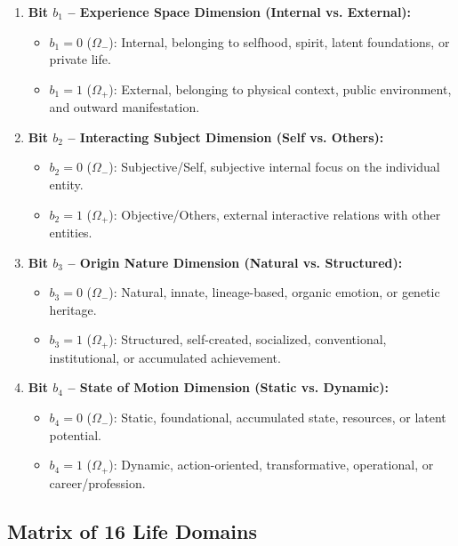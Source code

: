 \documentclass[a4paper,14pt, twoside]{memoir}
\begin{document}
\begin{enumerate}[label=\arabic*.]
	\item \textbf{Bit $b_1$ -- Experience Space Dimension (Internal vs. External):}
	      \begin{itemize}
		      \item $b_1 = 0$ ($\Omega_-$): Internal, belonging to selfhood, spirit, latent foundations, or private life.
		      \item $b_1 = 1$ ($\Omega_+$): External, belonging to physical context, public environment, and outward manifestation.
	      \end{itemize}

	\item \textbf{Bit $b_2$ -- Interacting Subject Dimension (Self vs. Others):}
	      \begin{itemize}
		      \item $b_2 = 0$ ($\Omega_-$): Subjective/Self, subjective internal focus on the individual entity.
		      \item $b_2 = 1$ ($\Omega_+$): Objective/Others, external interactive relations with other entities.
	      \end{itemize}

	\item \textbf{Bit $b_3$ -- Origin Nature Dimension (Natural vs. Structured):}
	      \begin{itemize}
		      \item $b_3 = 0$ ($\Omega_-$): Natural, innate, lineage-based, organic emotion, or genetic heritage.
		      \item $b_3 = 1$ ($\Omega_+$): Structured, self-created, socialized, conventional, institutional, or accumulated achievement.
	      \end{itemize}

	\item \textbf{Bit $b_4$ -- State of Motion Dimension (Static vs. Dynamic):}
	      \begin{itemize}
		      \item $b_4 = 0$ ($\Omega_-$): Static, foundational, accumulated state, resources, or latent potential.
		      \item $b_4 = 1$ ($\Omega_+$): Dynamic, action-oriented, transformative, operational, or career/profession.
	      \end{itemize}
\end{enumerate}

\subsection{Matrix of 16 Life Domains}
\end{document}
